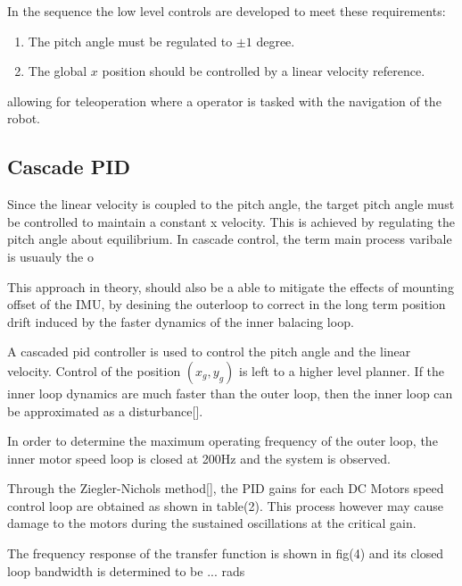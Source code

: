         In the sequence the low level controls are developed to meet these requirements:
        \begin{enumerate}
            \item The pitch angle must be regulated to $±1$ degree.
            \item The global $x$ position should be controlled by a linear velocity reference.
        \end{enumerate}
        allowing for teleoperation where a operator is tasked with the navigation of the robot. 






        \subsection{Cascade PID}
        Since the linear velocity is coupled to the
        pitch angle, the target pitch angle must be controlled to maintain a constant x velocity. 
        This is achieved by regulating the pitch angle about equilibrium. In cascade control, the term main process varibale 
        is usuauly the o

        This approach in theory, should also be a able to mitigate the effects of mounting offset of the IMU, by desining the outerloop
        to correct in the long term position drift induced by the faster dynamics of the inner balacing loop.

        A cascaded pid controller is used to control the pitch angle and the linear velocity. 
        Control of the position $(x_g,y_g)$ is left to a higher level planner.  
        If the inner loop dynamics are much faster than the outer loop, 
        then the inner loop can be approximated as a disturbance[].

        In order to determine the maximum operating frequency of the outer loop, 
        the inner motor speed loop is closed at 200Hz and the system is observed.
        
        Through the Ziegler-Nichols method[], the PID gains for each DC Motors speed control loop 
        are obtained as shown in table(2). This process however may cause damage to the motors 
        during the sustained oscillations at the critical gain. 
       
        The frequency response of the transfer function is shown in fig(4) 
        and its closed loop bandwidth is determined to be ... rads

